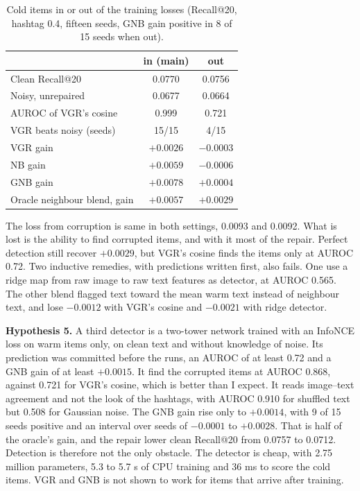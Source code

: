 \documentclass[conference]{IEEEtran}
\begin{document}
\begin{table}[!htb]
\centering\caption{Cold items in or out of the training losses (Recall@20, hashtag 0.4, fifteen seeds, GNB gain positive in 8 of 15 seeds when out).}
\label{tab:transductive}
\footnotesize\setlength{\tabcolsep}{3pt}
\begin{tabular}{@{}lcc@{}}
\hline
 & in (main) & out \\
\hline
Clean Recall@20 & 0.0770 & 0.0756 \\
Noisy, unrepaired & 0.0677 & 0.0664 \\
AUROC of VGR's cosine & 0.999 & 0.721 \\
VGR beats noisy (seeds) & 15/15 & 4/15 \\
VGR gain & $+0.0026$ & $-0.0003$ \\
NB gain & $+0.0059$ & $-0.0006$ \\
GNB gain & $+0.0078$ & $+0.0004$ \\
Oracle neighbour blend, gain & $+0.0057$ & $+0.0029$ \\
\hline
\end{tabular}
\end{table}

The loss from corruption is same in both settings, 0.0093 and 0.0092. What is lost is the ability to find corrupted items, and with it most of the repair. Perfect detection still recover $+0.0029$, but VGR's cosine finds the items only at AUROC 0.72. Two inductive remedies, with predictions written first, also fails. One use a ridge map from raw image to raw text features as detector, at AUROC 0.565. The other blend flagged text toward the mean warm text instead of neighbour text, and lose $-0.0012$ with VGR's cosine and $-0.0021$ with ridge detector.

\textbf{Hypothesis 5.} A third detector is a two-tower network trained with an InfoNCE loss on warm items only, on clean text and without knowledge of noise. Its prediction was committed before the runs, an AUROC of at least 0.72 and a GNB gain of at least $+0.0015$. It find the corrupted items at AUROC 0.868, against 0.721 for VGR's cosine, which is better than I expect. It reads image--text agreement and not the look of the hashtags, with AUROC 0.910 for shuffled text but 0.508 for Gaussian noise. The GNB gain rise only to $+0.0014$, with 9 of 15 seeds positive and an interval over seeds of $-0.0001$ to $+0.0028$. That is half of the oracle's gain, and the repair lower clean Recall@20 from 0.0757 to 0.0712. Detection is therefore not the only obstacle. The detector is cheap, with 2.75 million parameters, 5.3 to 5.7 s of CPU training and 36 ms to score the cold items. VGR and GNB is not shown to work for items that arrive after training.
\end{document}
